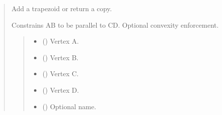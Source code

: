 \documentclass[letterpaper,10pt,english]{sphinxmanual}
\begin{document}
\begin{quote}
\begin{fulllineitems}
\begin{fulllineitems}
\label{\detokenize{pygeox:pygeox.add_objects.AddNamespace.trapezoid}}
\pysigstartsignatures
\pysiglinewithargsret
{}
{\sphinxparamcomma {}\sphinxparamcomma {}\sphinxparamcomma {}\sphinxparamcomma {}\sphinxparamcomma {}\sphinxparamcomma {}}
{}
\pysigstopsignatures
\sphinxAtStartPar
Add a trapezoid or return a copy.

\sphinxAtStartPar
Constrains AB to be parallel to CD. Optional convexity enforcement.
\begin{quote}\begin{description}
\begin{itemize}
\item {} 
\sphinxAtStartPar
{} (\sphinxstyleliteralemphasis{\sphinxupquote{ | }}) \textendash{} Vertex A.

\item {} 
\sphinxAtStartPar
{} (\sphinxstyleliteralemphasis{\sphinxupquote{ | }}) \textendash{} Vertex B.

\item {} 
\sphinxAtStartPar
{} (\sphinxstyleliteralemphasis{\sphinxupquote{ | }}) \textendash{} Vertex C.

\item {} 
\sphinxAtStartPar
{} (\sphinxstyleliteralemphasis{\sphinxupquote{ | }}) \textendash{} Vertex D.

\item {} 
\sphinxAtStartPar
{} (\sphinxstyleliteralemphasis{\sphinxupquote{ | }}) \textendash{} Optional name.


\end{itemize}
\end{description}
\end{quote}
\end{fulllineitems}
\end{fulllineitems}
\end{quote}
\end{document}
